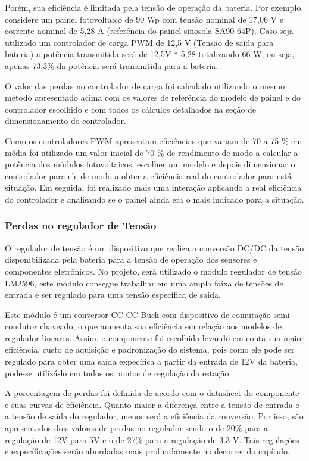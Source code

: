 	Porém, sua eficiência é limitada pela tensão de operação da bateria. Por exemplo, considere um painel fotovoltaico de 90 Wp com tensão nominal de 17,06 V e corrente nominal de 5,28 A (referência do painel sinosola SA90-64P). Caso seja utilizado um controlador de carga PWM de 12,5 V (Tensão de saída para bateria) a potência transmitida será de 12,5V * 5,28 totalizando 66 W, ou seja, apenas 73,3\% da potência será transmitida para a bateria.
	
	O valor das perdas no controlador de carga foi calculado utilizando o mesmo método apresentado acima com os valores de referência do modelo de painel e do controlador escolhido e com todos os cálculos detalhados na seção de dimensionamento do controlador. 
	
	Como os controladores PWM apresentam eficiências que variam de 70 a 75 \% em média foi utilizado um valor inicial de 70 \% de rendimento de modo a calcular a potência dos módulos fotovoltaicos, escolher um modelo e depois dimensionar o controlador para ele de modo a obter a eficiência real do controlador para está situação. Em seguida, foi realizado mais uma interação aplicando a real eficiência do controlador e analisando se o painel ainda era o mais indicado para a situação.

\subsubsection{Perdas no regulador de Tensão}

	O regulador de tensão é um dispositivo que realiza a conversão DC/DC da tensão disponibilizada pela bateria para a tensão de operação dos sensores e componentes eletrônicos. No projeto, será utilizado o módulo regulador de tensão LM2596, este módulo consegue trabalhar em uma ampla faixa de tensões de entrada e ser regulado para uma tensão específica de saída. 
	
	Este módulo é um conversor CC-CC Buck com dispositivo de comutação semi-condutor chaveado, o que aumenta sua eficiência em relação aos modelos de regulador lineares. Assim, o componente foi escolhido levando em conta sua maior eficiência, custo de aquisição e padronização do sistema, pois como ele pode ser regulado para obter uma saída expecífica a partir da entrada de 12V da bateria, pode-se utilizá-lo em todos os pontos de regulação da estação.	
	
	A porcentagem de perdas foi definida de acordo com o datasheet do componente e suas curvas de eficiência. Quanto maior a diferença entre a tensão de entrada e a tensão de saída do regulador, menor será a eficiência da conversão. Por isso, são apresentados dois valores de perdas no regulador sendo o de 20\% para a regulação de 12V para 5V e o de 27\% para a regulação de 3.3 V. Tais regulações e expecíficações serão abordadas mais profundamente no decorrer do capítulo.
	
